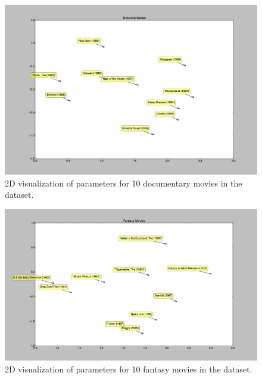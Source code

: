 \begin{figure}[H]
\centering
\includegraphics[width=\textwidth]{documentaries_2d_vis}
\caption{2D visualization of parameters for 10 documentary movies in the dataset.}
\end{figure}


\pagebreak

\begin{figure}[H]
\centering
\includegraphics[width=\textwidth]{fantasy_2d_vis}
\caption{2D visualization of parameters for 10 fantasy movies in the dataset.}
\end{figure}



